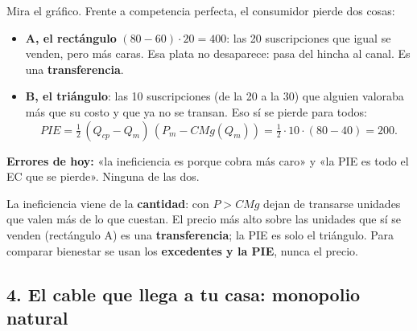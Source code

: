 \documentclass[11pt]{article}
\begin{document}
\begin{center}
\end{center}

Mira el gráfico. Frente a competencia perfecta, el consumidor pierde dos cosas:
\begin{itemize}[leftmargin=*,itemsep=2pt]
\item \textbf{A, el rectángulo} $(80 - 60)\cdot 20 = 400$: las 20 suscripciones que igual se venden, pero más caras. Esa plata no desaparece: pasa del hincha al canal. Es una \textbf{transferencia}.
\item \textbf{B, el triángulo}: las 10 suscripciones (de la 20 a la 30) que alguien valoraba más que su costo y que ya no se transan. Eso sí se pierde para todos:
\[
PIE = \tfrac12\,(Q_{cp} - Q_m)\,(P_m - CMg(Q_m)) = \tfrac12\cdot 10\cdot(80 - 40) = 200.
\]
\end{itemize}

\begin{error}
\textbf{Errores de hoy:} «la ineficiencia es porque cobra más caro» y «la PIE es todo el EC que se pierde». Ninguna de las dos.
\end{error}
\begin{clave}
La ineficiencia viene de la \textbf{cantidad}: con $P > CMg$ dejan de transarse unidades que valen más de lo que cuestan. El precio más alto sobre las unidades que sí se venden (rectángulo A) es una \textbf{transferencia}; la PIE es solo el triángulo. Para comparar bienestar se usan los \textbf{excedentes y la PIE}, nunca el precio.
\end{clave}

\subsection*{4. El cable que llega a tu casa: monopolio natural}
\end{document}
